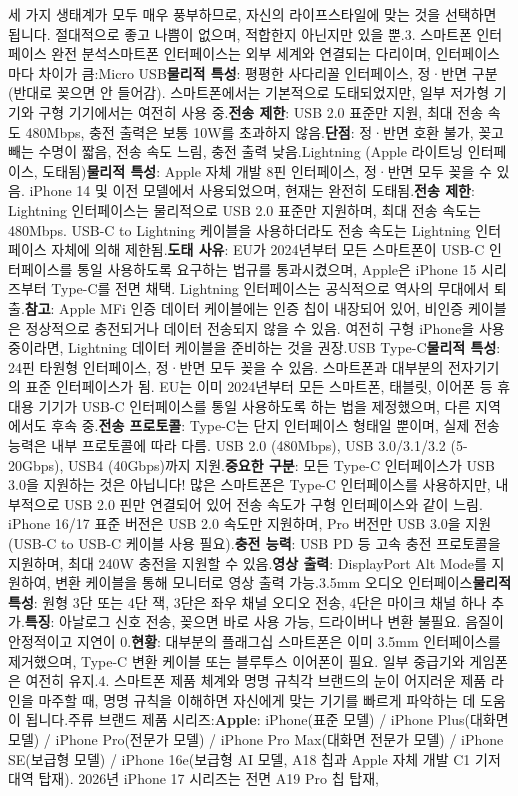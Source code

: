 세 가지 생태계가 모두 매우 풍부하므로, 자신의 라이프스타일에 맞는 것을 선택하면 됩니다. 절대적으로 좋고 나쁨이 없으며, 적합한지 아닌지만 있을 뿐.3. 스마트폰 인터페이스 완전 분석스마트폰 인터페이스는 외부 세계와 연결되는 다리이며, 인터페이스마다 차이가 큼:Micro USB\textbf{물리적 특성}: 평평한 사다리꼴 인터페이스, 정·반면 구분(반대로 꽂으면 안 들어감). 스마트폰에서는 기본적으로 도태되었지만, 일부 저가형 기기와 구형 기기에서는 여전히 사용 중.\textbf{전송 제한}: USB 2.0 표준만 지원, 최대 전송 속도 480Mbps, 충전 출력은 보통 10W를 초과하지 않음.\textbf{단점}: 정·반면 호환 불가, 꽂고 빼는 수명이 짧음, 전송 속도 느림, 충전 출력 낮음.Lightning (Apple 라이트닝 인터페이스, 도태됨)\textbf{물리적 특성}: Apple 자체 개발 8핀 인터페이스, 정·반면 모두 꽂을 수 있음. iPhone 14 및 이전 모델에서 사용되었으며, 현재는 완전히 도태됨.\textbf{전송 제한}: Lightning 인터페이스는 물리적으로 USB 2.0 표준만 지원하며, 최대 전송 속도는 480Mbps. USB-C to Lightning 케이블을 사용하더라도 전송 속도는 Lightning 인터페이스 자체에 의해 제한됨.\textbf{도태 사유}: EU가 2024년부터 모든 스마트폰이 USB-C 인터페이스를 통일 사용하도록 요구하는 법규를 통과시켰으며, Apple은 iPhone 15 시리즈부터 Type-C를 전면 채택. Lightning 인터페이스는 공식적으로 역사의 무대에서 퇴출.\textbf{참고}: Apple MFi 인증 데이터 케이블에는 인증 칩이 내장되어 있어, 비인증 케이블은 정상적으로 충전되거나 데이터 전송되지 않을 수 있음. 여전히 구형 iPhone을 사용 중이라면, Lightning 데이터 케이블을 준비하는 것을 권장.USB Type-C\textbf{물리적 특성}: 24핀 타원형 인터페이스, 정·반면 모두 꽂을 수 있음. 스마트폰과 대부분의 전자기기의 표준 인터페이스가 됨. EU는 이미 2024년부터 모든 스마트폰, 태블릿, 이어폰 등 휴대용 기기가 USB-C 인터페이스를 통일 사용하도록 하는 법을 제정했으며, 다른 지역에서도 후속 중.\textbf{전송 프로토콜}: Type-C는 단지 인터페이스 형태일 뿐이며, 실제 전송 능력은 내부 프로토콜에 따라 다름. USB 2.0 (480Mbps), USB 3.0/3.1/3.2 (5-20Gbps), USB4 (40Gbps)까지 지원.\textbf{중요한 구분}: 모든 Type-C 인터페이스가 USB 3.0을 지원하는 것은 아닙니다! 많은 스마트폰은 Type-C 인터페이스를 사용하지만, 내부적으로 USB 2.0 핀만 연결되어 있어 전송 속도가 구형 인터페이스와 같이 느림. iPhone 16/17 표준 버전은 USB 2.0 속도만 지원하며, Pro 버전만 USB 3.0을 지원 (USB-C to USB-C 케이블 사용 필요).\textbf{충전 능력}: USB PD 등 고속 충전 프로토콜을 지원하며, 최대 240W 충전을 지원할 수 있음.\textbf{영상 출력}: DisplayPort Alt Mode를 지원하여, 변환 케이블을 통해 모니터로 영상 출력 가능.3.5mm 오디오 인터페이스\textbf{물리적 특성}: 원형 3단 또는 4단 잭, 3단은 좌우 채널 오디오 전송, 4단은 마이크 채널 하나 추가.\textbf{특징}: 아날로그 신호 전송, 꽂으면 바로 사용 가능, 드라이버나 변환 불필요. 음질이 안정적이고 지연이 0.\textbf{현황}: 대부분의 플래그십 스마트폰은 이미 3.5mm 인터페이스를 제거했으며, Type-C 변환 케이블 또는 블루투스 이어폰이 필요. 일부 중급기와 게임폰은 여전히 유지.4. 스마트폰 제품 체계와 명명 규칙각 브랜드의 눈이 어지러운 제품 라인을 마주할 때, 명명 규칙을 이해하면 자신에게 맞는 기기를 빠르게 파악하는 데 도움이 됩니다.주류 브랜드 제품 시리즈:\textbf{Apple}: iPhone(표준 모델) / iPhone Plus(대화면 모델) / iPhone Pro(전문가 모델) / iPhone Pro Max(대화면 전문가 모델) / iPhone SE(보급형 모델) / iPhone 16e(보급형 AI 모델, A18 칩과 Apple 자체 개발 C1 기저대역 탑재). 2026년 iPhone 17 시리즈는 전면 A19 Pro 칩 탑재, 